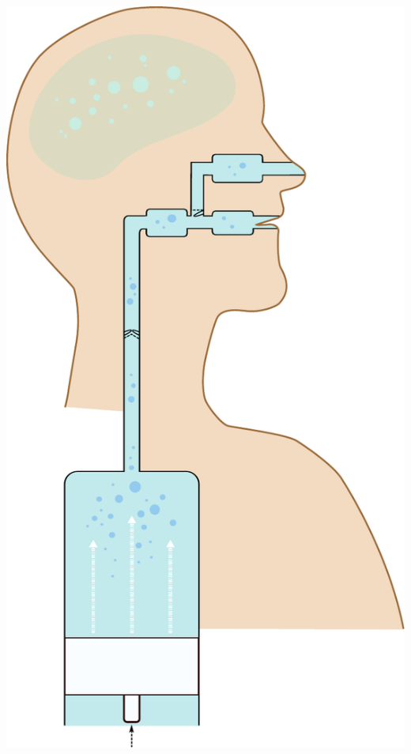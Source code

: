 \documentclass[9pt]{beamer}
\begin{document}
\begin{frame}[b]
    \includegraphics[width=0.28\paperwidth]{tubes}
\end{frame}
\end{document}
